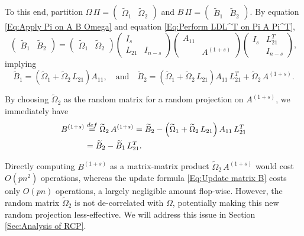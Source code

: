 \documentclass[11pt]{article}
\begin{document}
To this end, partition $\Omega \, \Pi = \left(
\begin{array}{cc}
\widetilde{\Omega}_1 & \widetilde{\Omega}_2 
\end{array}
\right)$ and $B \, \Pi = \left(
\begin{array}{cc}
\widetilde{B}_1 & \widetilde{B}_2 
\end{array}
\right)$. By equation \eqref{Eq:Apply Pi on A B Omega} and equation \eqref{Eq:Perform LDL^T on Pi A Pi^T},
\begin{equation*} 
\left(
\begin{array}{cc}
\widetilde{B}_1 & \widetilde{B}_2 
\end{array}
\right) = \left(
\begin{array}{cc}
\widetilde{\Omega}_1 & \widetilde{\Omega}_2 
\end{array}
\right) \left(
\begin{array}{cc}
I_s &  \\
L_{21} & I_{n-s}
\end{array}
\right)  \left(
\begin{array}{cc}
A_{11} &  \\
& A^{(1 + s)} 
\end{array}
\right)  \left(
\begin{array}{cc}
I_s & L_{21}^T \\
& I_{n-s}
\end{array}
\right), 
\end{equation*}
implying 
\[\widetilde{B}_1 = \left(\widetilde{\Omega}_1 + \widetilde{\Omega}_2 \, L_{21}\right) A_{11}, \quad \mbox{and} \quad \widetilde{B}_2 = \left(\widetilde{\Omega}_1 + \widetilde{\Omega}_2 \, L_{21}\right) A_{11} \, L_{21}^T + \widetilde{\Omega}_2 \, A^{(1 + s)} . \]

By choosing $\widetilde{\Omega}_2$ as the random matrix for a random projection on $A^{(1+s)}$, we immediately have 
\begin{align}\label{Eq:Update matrix B}
B^{(1+s)} & \stackrel{def}{=} \widetilde{\Omega}_2 \, A^{(1+s)} = \widetilde{B}_2 - \left( \widetilde{\Omega}_1  + \widetilde{\Omega}_2 \, L_{21} \right)A_{11} \, L_{21}^T  \notag\\
& = \widetilde{B}_2 - \widetilde{B}_1 \, L_{21}^T.
\end{align}

Directly computing $B^{(1+s)}$ as a matrix-matrix product $\widetilde{\Omega}_2 \, A^{(1+s)}$ would cost $O\left(pn^2\right)$ operations, whereas the update formula \eqref{Eq:Update matrix B} costs only $O\left(pn\right)$ operations, a largely negligible amount flop-wise. However, the random matrix $\widetilde{\Omega}_2$ is not de-correlated with $\Omega$, potentially making this new random projection less-effective. We will address this issue in Section \ref{Sec:Analysis of RCP}.
\end{document}
